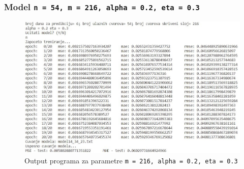 \documentclass[a4paper]{article}
\begin{document}
\pagebreak %
\subsubsection{Model \texttt{n = 54, m = 216, alpha = 0.2, eta = 0.3}}
\begin{figure}[h!]
\begin{center}
\includegraphics[scale=0.9]{output/output_example_program_14_34_23.JPG}
\end{center}
\caption{Output programa za parametre \texttt{m = 216, alpha = 0.2, eta = 0.3}}
\end{figure}
\end{document}
